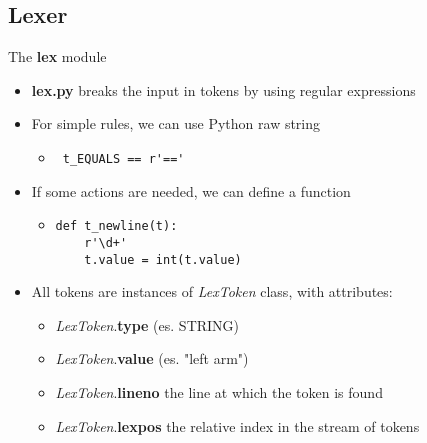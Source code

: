 \subsection{Lexer}
\begin{frame}[fragile]{The \textbf{lex} module}
  \begin{itemize}
    \item \textbf{lex.py} breaks the input in tokens by using regular 
    expressions
\n
    \item For simple rules, we can use Python raw string
    \begin{itemize}
      \item \begin{verbatim} t_EQUALS == r'==' \end{verbatim}
    \end{itemize}
\n
    \item If some actions are needed, we can define a function
    \begin{itemize}
      \item 
      \begin{verbatim} 
def t_newline(t):
    r'\d+'
    t.value = int(t.value) \end{verbatim}
    \end{itemize}
\n
    \item All tokens are instances of \emph{LexToken} class, with attributes:
    \begin{itemize}
      \item \emph{LexToken}.\textbf{type} \tab (es. STRING)
      \item \emph{LexToken}.\textbf{value} \tab (es. "left arm")
      \item \emph{LexToken}.\textbf{lineno} \tab the line at which the token 
      is found
      \item \emph{LexToken}.\textbf{lexpos} \tab the relative index in the stream of tokens
    \end{itemize}
  \end{itemize}
%
%
\N\N
\end{frame}


